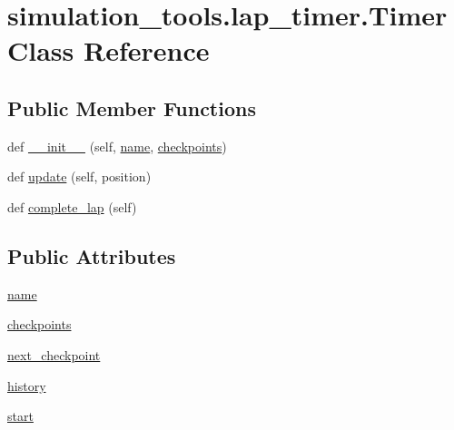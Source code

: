 \hypertarget{classsimulation__tools_1_1lap__timer_1_1_timer}{}\section{simulation\+\_\+tools.\+lap\+\_\+timer.\+Timer Class Reference}
\label{classsimulation__tools_1_1lap__timer_1_1_timer}
\subsection*{Public Member Functions}
\begin{DoxyCompactItemize}
\item 
def \hyperlink{classsimulation__tools_1_1lap__timer_1_1_timer_a526781ad4e5c09fbe04dda1e5a3f3fd9}{\+\_\+\+\_\+init\+\_\+\+\_\+} (self, \hyperlink{classsimulation__tools_1_1lap__timer_1_1_timer_a9bf911e55976cb1d04b10440cea407c1}{name}, \hyperlink{classsimulation__tools_1_1lap__timer_1_1_timer_ae042ce601347d175584be16d8166a74e}{checkpoints})
\item 
def \hyperlink{classsimulation__tools_1_1lap__timer_1_1_timer_ae9b21a99e315e66e34311c6b9feeb0e8}{update} (self, position)
\item 
def \hyperlink{classsimulation__tools_1_1lap__timer_1_1_timer_a9fac2e869ccbcd86651e333301d8cc33}{complete\+\_\+lap} (self)
\end{DoxyCompactItemize}
\subsection*{Public Attributes}
\begin{DoxyCompactItemize}
\item 
\hyperlink{classsimulation__tools_1_1lap__timer_1_1_timer_a9bf911e55976cb1d04b10440cea407c1}{name}
\item 
\hyperlink{classsimulation__tools_1_1lap__timer_1_1_timer_ae042ce601347d175584be16d8166a74e}{checkpoints}
\item 
\hyperlink{classsimulation__tools_1_1lap__timer_1_1_timer_a74b19b620b1f59ce1d558524c275f4c3}{next\+\_\+checkpoint}
\item 
\hyperlink{classsimulation__tools_1_1lap__timer_1_1_timer_a5f5e50dc374ab88c05748ab49392b881}{history}
\item 
\hyperlink{classsimulation__tools_1_1lap__timer_1_1_timer_afc51d0e4a6aa0e19be5c8622352b9afe}{start}
\end{DoxyCompactItemize}


